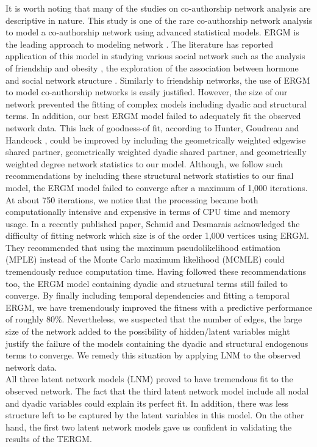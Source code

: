 It is worth noting that many of the studies on co-authorship network analysis are descriptive in nature. This study is one of the rare co-authorship network analysis to model a co-authorship network using advanced statistical models. ERGM is the leading approach to modeling network \cite{schmid_exponential_2017}. The literature has reported application of this model in studying various social network such as the analysis of friendship and obesity \cite{valente_adolescent_2009,de_la_haye_obesity-related_2010}, the exploration of the association between hormone and social network structure \cite{kornienko_hormones_2014}. Similarly to friendship networks, the use of ERGM to model co-authorship networks is easily justified. However, the size of our network prevented the fitting of complex models including dyadic and structural terms. In addition, our best ERGM model failed to adequately fit the observed network data. This lack of goodness-of fit, according to Hunter, Goudreau and Handcock \cite{hunter_goodness_2008}, could be improved by including the geometrically weighted edgewise shared partner, geometrically weighted dyadic shared partner, and geometrically weighted degree network statistics to our model. Although, we follow such recommendations by including these structural network statistics to our final model, the ERGM model failed to converge after a maximum of 1,000 iterations. At about 750 iterations, we notice that the processing became both computationally intensive and expensive in terms of CPU time and memory usage. In a recently published paper, Schmid and Desmarais \cite{schmid_exponential_2017} acknowledged the difficulty of fitting network which size is of the order 1,000 vertices using ERGM. They recommended that using the maximum pseudolikelihood estimation (MPLE) instead of the Monte Carlo maximum likelihood (MCMLE) could tremendously reduce computation time. Having followed these recommendations too, the ERGM model containing dyadic and structural terms still failed to converge. By finally including temporal dependencies and fitting a temporal ERGM, we have tremendously improved the fitness with a predictive performance of roughly 80\%. Nevertheless, we suspected that the number of edges, the large size of the network added to the possibility of hidden/latent variables might justify the failure of the models containing the dyadic and structural endogenous terms to converge. We remedy this situation by applying LNM to the observed network data. \\
All three latent network models (LNM) proved to have tremendous fit to the observed network. The fact that the third latent network model include all nodal and dyadic variables could explain its perfect fit. In addition, there was less structure left to be captured by the latent variables in this model. On the other hand, the first two latent network models gave us confident in validating the results of the TERGM. \\
